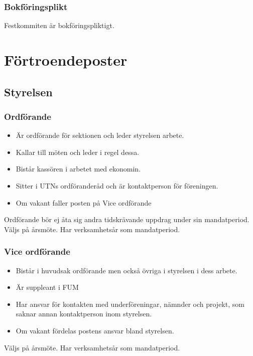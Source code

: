 \documentclass{../resources/dgovdoc}
\begin{document}
\subsubsection{Bokföringsplikt}

Festkommiten är bokföringspliktigt. 

\section{Förtroendeposter}

\subsection{Styrelsen}

\subsubsection{Ordförande}

\begin{itemize}
\item Är ordförande för sektionen och leder styrelsen arbete.
\item Kallar till möten och leder i regel dessa.
\item Bistår kassören i arbetet med ekonomin.
\item Sitter i UTNs ordföranderåd och är kontaktperson för föreningen.
\item Om vakant faller posten på Vice ordförande
\end{itemize} 
Ordförande bör ej åta sig andra tidskrävande uppdrag under sin mandatperiod. 
Väljs på årsmöte. Har verksamhetsår som mandatperiod.

\subsubsection{Vice ordförande} 

\begin{itemize}
\item Bistår i huvudsak ordförande men också övriga i styrelsen i dess arbete.
\item Är suppleant i FUM
\item Har ansvar för kontakten med underföreningar, nämnder och projekt, som saknar annan kontaktperson inom styrelsen.
\item Om vakant fördelas postens ansvar bland styrelsen.
\end{itemize}
Väljs på årsmöte. Har verksamhetsår som mandatperiod. 
\end{document}
